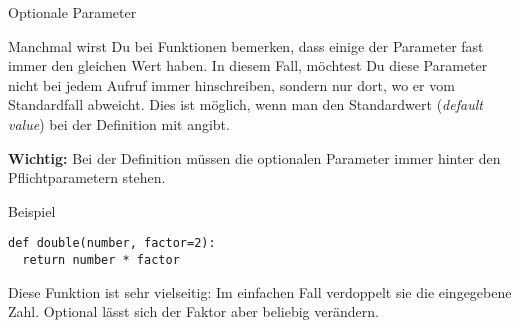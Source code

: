 \begin{fragile}

\begin{block}{Optionale Parameter}
	
	\pause 
	
\vspace{2pt}
Manchmal wirst Du bei Funktionen bemerken, dass einige der Parameter fast immer den gleichen Wert haben. In diesem Fall, möchtest Du diese Parameter nicht bei jedem Aufruf immer hinschreiben, sondern nur dort, wo er vom Standardfall abweicht. Dies ist möglich, wenn man den Standardwert (\emph{default value}) bei der Definition mit angibt. 

\pause 

\textbf{Wichtig:} Bei der Definition müssen die optionalen Parameter immer hinter den Pflichtparametern stehen.
\end{block}

\vspace{12pt}
\pause 

\begin{exampleblock}{Beispiel}
\begin{verbatim}
def double(number, factor=2): 
  return number * factor
\end{verbatim} 


\pause 

Diese Funktion ist sehr vielseitig: Im einfachen Fall verdoppelt sie die eingegebene Zahl. Optional lässt sich der Faktor aber beliebig verändern. 
\end{exampleblock}

\end{fragile}


